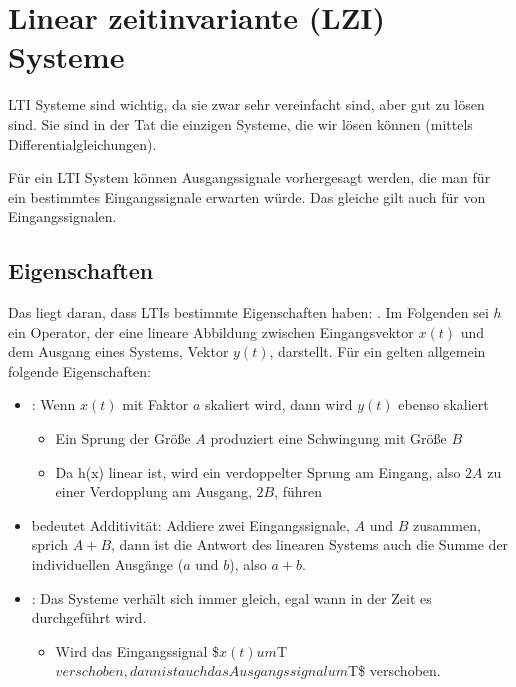 \documentclass[letterpaper,10pt,english]{jupyterBook}
\begin{document}
\sphinxstepscope


\section{Linear zeitinvariante (LZI) Systeme}
\label{\detokenize{content/5_LTI:linear-zeitinvariante-lzi-systeme}}\label{\detokenize{content/5_LTI::doc}}
\sphinxAtStartPar


\sphinxAtStartPar
LTI Systeme sind wichtig, da sie zwar sehr vereinfacht sind, aber gut zu lösen sind. Sie sind in der Tat die einzigen Systeme, die wir lösen können (mittels Differentialgleichungen).

\sphinxAtStartPar
Für ein LTI System können Ausgangssignale vorhergesagt werden, die man für ein bestimmtes Eingangssignale erwarten würde. Das gleiche gilt auch für  von Eingangssignalen.


\subsection{Eigenschaften}
\label{\detokenize{content/5_LTI:eigenschaften}}
\sphinxAtStartPar
Das liegt daran, dass LTIs bestimmte Eigenschaften haben: .
Im Folgenden sei \(h\) ein Operator, der eine lineare Abbildung zwischen Eingangsvektor \(x(t)\) und dem Ausgang eines Systems, Vektor \(y(t)\), darstellt.
Für ein  gelten allgemein folgende Eigenschaften:
\begin{itemize}
\item {} 
\sphinxAtStartPar
{}: Wenn \(x(t)\) mit Faktor \(a\) skaliert wird, dann wird \(y(t)\) ebenso skaliert
\begin{itemize}
\item {} 
\sphinxAtStartPar
Ein Sprung der Größe \(A\) produziert eine Schwingung mit Größe \(B\)

\item {} 
\sphinxAtStartPar
Da h(x) linear ist, wird ein verdoppelter Sprung am Eingang, also \(2A\) zu einer Verdopplung am Ausgang, \(2B\), führen

\end{itemize}

\item {} 
\sphinxAtStartPar
{} bedeutet Additivität: Addiere zwei Eingangssignale, \(A\) und \(B\) zusammen, sprich \(A+B\), dann ist die Antwort des linearen Systems auch die Summe der individuellen Ausgänge (\(a\) und \(b\)), also \(a+b\).

\item {} 
\sphinxAtStartPar
{}: Das Systeme verhält sich immer gleich, egal wann in der Zeit es durchgeführt wird.
\begin{itemize}
\item {} 
\sphinxAtStartPar
Wird das Eingangssignal \$\(x(t) um \)T\( verschoben, dann ist auch das Ausgangssignal um \)T\$ verschoben.

\end{itemize}

\end{itemize}
\end{document}
